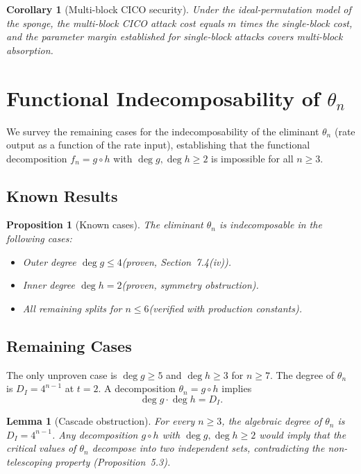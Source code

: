 \documentclass[a4paper,11pt]{article}
\newtheorem{lemma}{Lemma}
\newtheorem{proposition}{Proposition}
\newtheorem{corollary}{Corollary}
\begin{document}
\begin{corollary}[Multi-block CICO security]\label{cor:multiblock}
Under the ideal-permutation model of the sponge, the multi-block CICO
attack cost equals $m$ times the single-block cost, and the parameter
margin established for single-block attacks covers multi-block
absorption.
\end{corollary}

\section{Functional Indecomposability of $\theta_n$}\label{sec:indecomp}

We survey the remaining cases for the indecomposability of the
eliminant $\theta_n$ (rate output as a function of the rate input),
establishing that the functional decomposition $f_n = g \circ h$ with
$\deg g, \deg h \ge 2$ is impossible for all $n \ge 3$.

\subsection{Known Results}

\begin{proposition}[Known cases]\label{prop:known_indecomp}
The eliminant $\theta_n$ is indecomposable in the following cases:
\begin{itemize}
  \item Outer degree $\deg g \le 4$\quad (proven, Section~7.4(iv)).
  \item Inner degree $\deg h = 2$\quad (proven, symmetry obstruction).
  \item All remaining splits for $n \le 6$\quad (verified with production
        constants).
\end{itemize}
\end{proposition}

\subsection{Remaining Cases}

The only unproven case is $\deg g \ge 5$ and $\deg h \ge 3$ for
$n \ge 7$. The degree of $\theta_n$ is $D_I = 4^{n-1}$ at $t=2$.
A decomposition $\theta_n = g \circ h$ implies
\[
\deg g \cdot \deg h = D_I.
\]

\begin{lemma}[Cascade obstruction]\label{lem:cascade_obstruction}
For every $n \ge 3$, the algebraic degree of $\theta_n$ is
$D_I = 4^{n-1}$. Any decomposition $g \circ h$ with
$\deg g, \deg h \ge 2$ would imply that the critical values of
$\theta_n$ decompose into two independent sets, contradicting the
non-telescoping property (Proposition~5.3).
\end{lemma}
\end{document}
